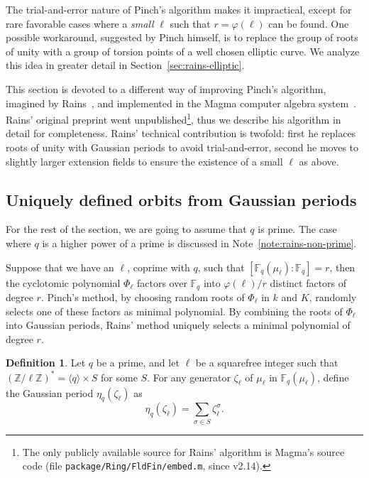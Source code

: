 \documentclass[12pt]{article}
\theoremstyle{plain}
\theoremstyle{definition}
\newtheorem{definition}[theorem]{Definition}
\def\Z{\ensuremath{\mathbb{Z}}}
\def\F{\ensuremath{\mathbb{F}}}
\def\euler{\ensuremath{\varphi}}
\newcounter{algorithm}
\begin{document}
The trial-and-error nature of Pinch's algorithm makes it impractical,
except for rare favorable cases where a \emph{small} $\ell$ such that
$r=\euler(\ell)$ can be found. One possible workaround, suggested by
Pinch himself, is to replace the group of roots of unity with a group
of torsion points of a well chosen elliptic curve. We analyze this
idea in greater detail in Section~\ref{sec:rains-elliptic}.

This section is devoted to a different way of improving Pinch's
algorithm, imagined by Rains~\cite{rains2008}, and implemented in the
Magma computer algebra system~\cite{MAGMA}. Rains' original preprint
went unpublished\footnote{The only publicly available source for
  Rains' algorithm is Magma's source code (file
  \texttt{package/Ring/FldFin/embed.m}, since v2.14).}, thus we
describe his algorithm in detail for completeness. Rains' technical
contribution is twofold: first he replaces roots of unity with
Gaussian periods to avoid trial-and-error, second he moves to slightly
larger extension fields to ensure the existence of a small $\ell$ as
above.

\subsection{Uniquely defined orbits from Gaussian periods}

For the rest of the section, we are going to assume that $q$ is
prime. The case where $q$ is a higher power of a prime is discussed in
Note~\ref{note:rains-non-prime}.

Suppose that we have an $\ell$, coprime with $q$, such that
$[\F_q(\mu_\ell):\F_q]=r$, then the cyclotomic polynomial $\Phi_\ell$
factors over $\F_q$ into $\euler(\ell)/r$ distinct factors of degree
$r$. Pinch's method, by choosing random roots of $\Phi_\ell$ in $k$
and $K$, randomly selects one of these factors as minimal polynomial.
By combining the roots of $\Phi_\ell$ into Gaussian periods, Rains'
method uniquely selects a minimal polynomial of degree $r$.

\begin{definition}
  Let $q$ be a prime, and let $\ell$ be a squarefree integer such that
  $(\Z/\ell\Z)^\ast = \langle q\rangle \times S$ for some $S$.  For any
  generator $\zeta_\ell$ of $\mu_\ell$ in $\F_q(\mu_\ell)$, define the
  Gaussian period $\eta_q(\zeta_\ell)$ as
  \begin{equation}
    \eta_q(\zeta_\ell) = \sum_{\sigma\in S}{\zeta_\ell^{\sigma}}.
  \end{equation}
\end{definition}
\end{document}
